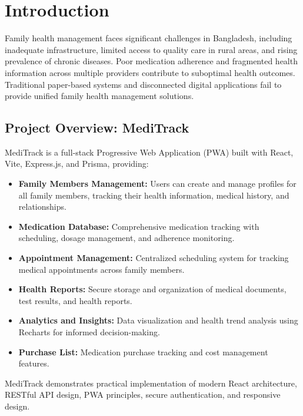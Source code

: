 \documentclass[12pt, a4paper]{report}
\begin{document}
\chapter{Introduction}

Family health management faces significant challenges in Bangladesh, including inadequate infrastructure, limited access to quality care in rural areas, and rising prevalence of chronic diseases. Poor medication adherence and fragmented health information across multiple providers contribute to suboptimal health outcomes. Traditional paper-based systems and disconnected digital applications fail to provide unified family health management solutions.

\section{Project Overview: MediTrack}
MediTrack is a full-stack Progressive Web Application (PWA) built with React, Vite, Express.js, and Prisma, providing:

\begin{itemize}
    \item \textbf{Family Members Management:} Users can create and manage profiles for all family members, tracking their health information, medical history, and relationships.
    \item \textbf{Medication Database:} Comprehensive medication tracking with scheduling, dosage management, and adherence monitoring.
    \item \textbf{Appointment Management:} Centralized scheduling system for tracking medical appointments across family members.
    \item \textbf{Health Reports:} Secure storage and organization of medical documents, test results, and health reports.
    \item \textbf{Analytics and Insights:} Data visualization and health trend analysis using Recharts for informed decision-making.
    \item \textbf{Purchase List:} Medication purchase tracking and cost management features.
\end{itemize}

MediTrack demonstrates practical implementation of modern React architecture, RESTful API design, PWA principles, secure authentication, and responsive design.

\end{document}
